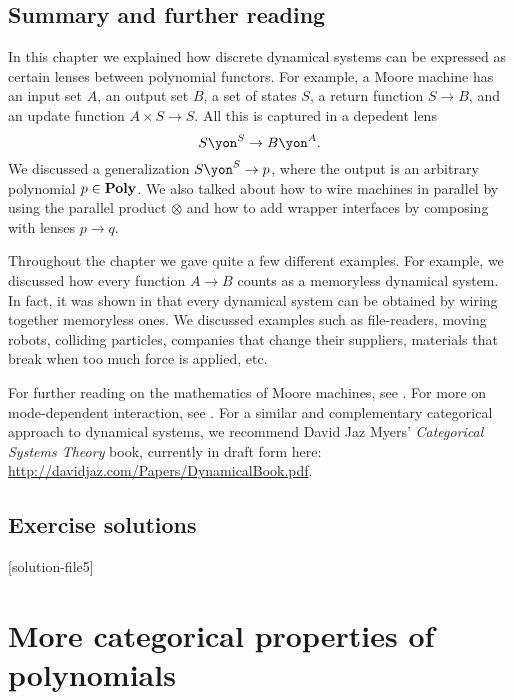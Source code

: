\documentclass[Book-Poly]{subfiles}
\begin{document}
\section{Summary and further reading}

In this chapter we explained how discrete dynamical systems can be expressed as certain lenses between polynomial functors. For example, a Moore machine has an input set $A$, an output set $B$, a set of states $S$, a return function $S\to B$, and an update function $A\times S\to S$. All this is captured in a depedent lens
\[S\yon^S\to B\yon^A.\]
We discussed a generalization $S\yon^S\to p$, where the output is an arbitrary polynomial $p\in\mathbf{Poly}$. We also talked about how to wire machines in parallel by using the parallel product $\otimes$ and how to add wrapper interfaces by composing with lenses $p\to q$.

Throughout the chapter we gave quite a few different examples. For example, we discussed how every function $A\to B$ counts as a memoryless dynamical system. In fact, it was shown in \cite{beurier2019memoryless} that every dynamical system can be obtained by wiring together memoryless ones. We discussed examples such as file-readers, moving robots, colliding particles, companies that change their suppliers, materials that break when too much force is applied, etc.

For further reading on the mathematics of Moore machines, see \cite{conway2012regular}. For more on mode-dependent interaction, see \cite{spivak2017nesting}. For a similar and complementary categorical approach to dynamical systems, we recommend David Jaz Myers' \emph{Categorical Systems Theory} book, currently in draft form here: \url{http://davidjaz.com/Papers/DynamicalBook.pdf}.


\section{Exercise solutions}
{\footnotesize
	}

[solution-file5]

\chapter{More categorical properties of polynomials} \label{ch.poly.bonus}
\end{document}
